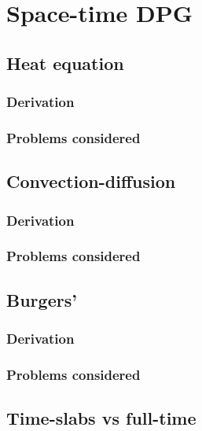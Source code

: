 \documentclass[Proposal.tex]{subfiles}
\begin{document}
\chapter{Space-time DPG}



\section{Heat equation}

\subsection{Derivation}

\subsection{Problems considered}


\section{Convection-diffusion}

\subsection{Derivation}

\subsection{Problems considered}


\section{Burgers'}

\subsection{Derivation}

\subsection{Problems considered}


\section{Time-slabs vs full-time}
\end{document}
